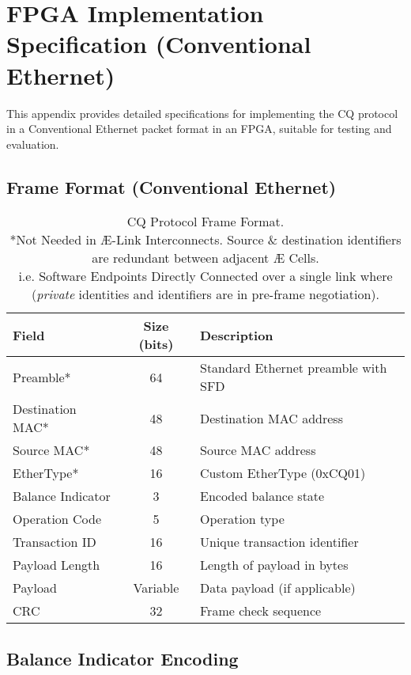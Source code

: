 \documentclass[../../../OAE-SPEC-MAIN.tex]{subfiles}
\begin{document}
\section{FPGA Implementation Specification (Conventional Ethernet)}

This appendix provides detailed specifications for implementing the CQ protocol in a Conventional Ethernet packet format in an FPGA, suitable for testing and evaluation.

\subsection{Frame Format (Conventional Ethernet)}


\begin{table}[h]
\hspace{-8pt}
\begin{tabular}{|l|c|l|}
\hline
\textbf{Field} & \textbf{Size (bits)} & \textbf{Description} \\
\hline
Preamble* & 64 & Standard Ethernet preamble with SFD \\
Destination MAC* & 48 & Destination MAC address \\
Source MAC* & 48 & Source MAC address \\
EtherType* & 16 & Custom EtherType (0xCQ01) \\
Balance Indicator & 3 & Encoded balance state \\
Operation Code & 5 & Operation type \\
Transaction ID & 16 & Unique transaction identifier \\
Payload Length & 16 & Length of payload in bytes \\
Payload & Variable & Data payload (if applicable) \\
CRC & 32 & Frame check sequence \\
\hline
\end{tabular}
\caption{CQ Protocol Frame Format. \\  \vspace{5pt} *Not Needed in Æ-Link Interconnects. Source \& destination identifiers are redundant between adjacent Æ Cells. \\i.e. Software Endpoints Directly Connected over a single link where (\emph{private} identities and identifiers are in pre-frame negotiation).}
\end{table}


\subsection{Balance Indicator Encoding}
\end{document}
